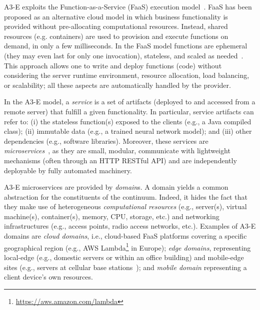 A3-E exploits the Function-as-a-Service (FaaS) execution model~\cite{MateosFaaster17}. FaaS has been proposed as an alternative cloud model in which business functionality is provided without pre-allocating computational resources. Instead, shared resources (e.g. containers) are used to provision and execute functions on demand, in only a few milliseconds. In the FaaS model functions are ephemeral (they may even last for only one invocation), stateless, and scaled as needed~\cite{Roberts:2016}. This approach allows one to write and deploy functions (code) without considering the server runtime environment, resource allocation, load balancing, or scalability; all these aspects are automatically handled by the provider.

In the A3-E model, a \textit{service} is a set of artifacts (deployed to and accessed from a remote server) that fulfill a given functionality. In particular, service artifacts can refer to: (i) the stateless function(s) exposed to the clients (e.g., a Java compiled class); (ii) immutable data (e.g., a trained neural network model); and (iii) other dependencies (e.g.,  software libraries). Moreover, these services are \textit{microservices}~\cite{lewis2014microservices}, as they are small, modular, communicate with lightweight mechanisms (often through an HTTP RESTful API) and are independently deployable by fully automated machinery.

A3-E microservices are provided by \textit{domain}s. A domain yields a common abstraction for the constituents of the continuum. Indeed, it hides the fact that they make use of heterogeneous \textit{computational resources} (e.g., server(s), virtual machine(s), container(s), memory, CPU, storage, etc.) and networking infrastructures (e.g., access points, radio access networks, etc.). Examples of A3-E domains are \textit{cloud domains}, i.e., cloud-based FaaS platforms covering a specific geographical region (e.g., AWS Lambda\footnote{\url{https://aws.amazon.com/lambda}} in Europe); \textit{edge domains}, representing local-edge (e.g., domestic servers or within an office building) and mobile-edge sites (e.g., servers at cellular base stations~\cite{beck2014mobile}); and \textit{mobile domain} representing a client device's own resources.

